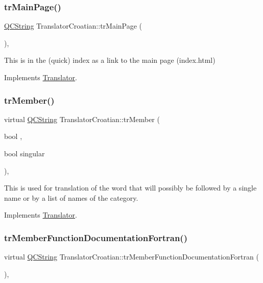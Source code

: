 \subsubsection{\texorpdfstring{trMainPage()}{trMainPage()}}
{\footnotesize\ttfamily \mbox{\hyperlink{class_q_c_string}{Q\+C\+String}} Translator\+Croatian\+::tr\+Main\+Page (\begin{DoxyParamCaption}{ }\end{DoxyParamCaption})\hspace{0.3cm}{\ttfamily [inline]}, {\ttfamily [virtual]}}

This is in the (quick) index as a link to the main page (index.\+html) 

Implements \mbox{\hyperlink{class_translator}{Translator}}.

\mbox{\label{class_translator_croatian_a1926acbe443abf154a47de6138890b03}} 
\subsubsection{\texorpdfstring{trMember()}{trMember()}}
{\footnotesize\ttfamily virtual \mbox{\hyperlink{class_q_c_string}{Q\+C\+String}} Translator\+Croatian\+::tr\+Member (\begin{DoxyParamCaption}\item[{bool}]{,  }\item[{bool}]{singular }\end{DoxyParamCaption})\hspace{0.3cm}{\ttfamily [inline]}, {\ttfamily [virtual]}}

This is used for translation of the word that will possibly be followed by a single name or by a list of names of the category. 

Implements \mbox{\hyperlink{class_translator}{Translator}}.

\mbox{\label{class_translator_croatian_a35efefe1960664105587cb5521828c15}} 
\subsubsection{\texorpdfstring{trMemberFunctionDocumentationFortran()}{trMemberFunctionDocumentationFortran()}}
{\footnotesize\ttfamily virtual \mbox{\hyperlink{class_q_c_string}{Q\+C\+String}} Translator\+Croatian\+::tr\+Member\+Function\+Documentation\+Fortran (\begin{DoxyParamCaption}{ }\end{DoxyParamCaption})\hspace{0.3cm}{\ttfamily [inline]}, {\ttfamily [virtual]}}

